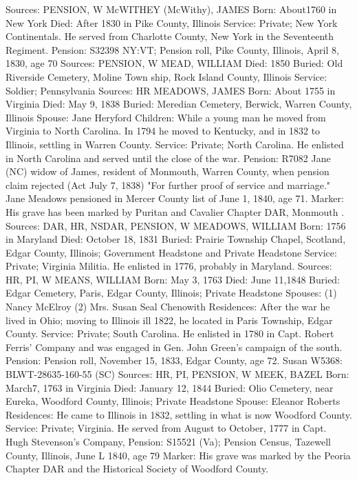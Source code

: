 Sources: PENSION, W 
McWITHEY (McWithy), JAMES
Born: About1760 in New York
Died: After 1830 in Pike County, Illinois 
Service: Private; New York Continentals. He served from Charlotte County, New York in the Seventeenth Regiment.
Pension: S32398 NY:VT; Pension roll, Pike County, Illinois, April 8, 1830, age 70
Sources: PENSION, W 
MEAD, WILLIAM
Died: 1850 
Buried: Old Riverside Cemetery, Moline Town ship, Rock Island County, Illinois 
Service: Soldier; Pennsylvania
Sources: HR 
MEADOWS, JAMES 
Born: About 1755 in Virginia 
Died: May 9, 1838
Buried: Meredian Cemetery, Berwick, Warren County, Illinois 
Spouse: Jane Heryford
Children: While a young man he moved from Virginia to North Carolina. In 1794 he moved to Kentucky, and in 1832 to Illinois, settling in Warren County. 
Service: Private; North Carolina. He enlisted in North Carolina and served until the close of the war. 
Pension: R7082 Jane (NC) widow of James, resident of Monmouth, Warren County, when pension claim rejected (Act July 7, 1838) "For further proof of service and marriage." Jane Meadows pensioned in Mercer County list of June 1, 1840, age 71.
Marker: His grave has been marked by Puritan and Cavalier Chapter DAR, Monmouth .
Sources: DAR, HR, NSDAR, PENSION, W 
MEADOWS, WILLIAM
Born: 1756 in Maryland
Died: October 18, 1831 
Buried: Prairie Township Chapel, Scotland, Edgar County, Illinois; Government Headstone and Private Headstone 
Service: Private; Virginia Militia. He enlisted in 1776, probably in Maryland.
Sources: HR, PI, W 
MEANS, WILLIAM
Born: May 3, 1763
Died: June 11,1848 
Buried: Edgar Cemetery, Paris, Edgar County, Illinois; Private Headstone 
Spouses: (1) Nancy McElroy 
	 (2) Mrs. Susan Seal Chenowith
Residences: After the war he lived in Ohio; moving to Illinois ill 1822, he located in Paris Township, Edgar County.
Service: Private; South Carolina. He enlisted in 1780 in Capt. Robert Ferris' Company and was engaged in Gen. John Green's campaign of the south. 
Pension: Pension roll, November 15, 1833, Edgar County, age 72. Susan W5368: BLWT-28635-160-55 (SC)
Sources: HR, PI, PENSION, W 
MEEK, BAZEL
Born: March7, 1763 in Virginia
Died: January 12, 1844 
Buried: Olio Cemetery, near Eureka, Woodford County, Illinois; Private Headstone
Spouse: Eleanor Roberts
Residences: He came to Illinois in 1832, settling in what is now Woodford County. 
Service: Private; Virginia. He served from August to October, 1777 in Capt. Hugh Stevenson's Company, 
Pension: S15521 (Va); Pension Census, Tazewell County, Illinois, June L 1840, age 79
Marker: His grave was marked by the Peoria Chapter DAR and the Historical Society of Woodford County.

